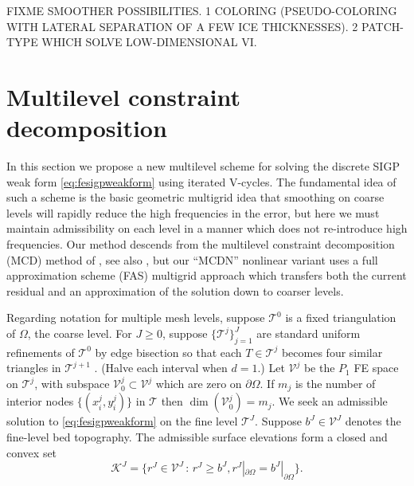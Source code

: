 \documentclass[letterpaper,final,12pt,reqno]{amsart}
\theoremstyle{claim}
\numberwithin{equation}{section}
\numberwithin{figure}{section}
\numberwithin{table}{section}
\numberwithin{theorem}{section}
\begin{document}
FIXME SMOOTHER POSSIBILITIES.  1 COLORING (PSEUDO-COLORING WITH LATERAL SEPARATION OF A FEW ICE THICKNESSES).  2 PATCH-TYPE WHICH SOLVE LOW-DIMENSIONAL VI.


\section{Multilevel constraint decomposition} \label{sec:mcdstokes}

In this section we propose a new multilevel scheme for solving the discrete SIGP weak form \eqref{eq:fesigpweakform} using iterated V-cycles.  The fundamental idea of such a scheme is the basic geometric multigrid idea that smoothing on coarse levels will rapidly reduce the high frequencies in the error, but here we must maintain admissibility on each level in a manner which does not re-introduce high frequencies.  Our method descends from the multilevel constraint decomposition (MCD) method of \cite{Tai2003}, see also \cite{GraeserKornhuber2009}, but our ``MCDN'' nonlinear variant uses a full approximation scheme (FAS) multigrid \cite{Trottenbergetal2001} approach which transfers both the current residual and an approximation of the solution down to coarser levels.

Regarding notation for multiple mesh levels, suppose $\mathcal{T}^0$ is a fixed triangulation of $\Omega$, the coarse level.  For $J\ge 0$, suppose $\{\mathcal{T}^j\}_{j=1}^J$ are standard uniform refinements of $\mathcal{T}^0$ by edge bisection so that each $T \in \mathcal{T}^j$ becomes four similar triangles in $\mathcal{T}^{j+1}$ \cite{Braess2007}.  (Halve each interval when $d=1$.)  Let $\mathcal{V}^j$ be the $P_1$ FE space on $\mathcal{T}^j$, with subspace $\mathcal{V}_0^j \subset \mathcal{V}^j$ which are zero on $\partial\Omega$.  If $m_j$ is the number of interior nodes $\{(x_i^j,y_i^j)\}$ in $\mathcal{T}$ then $\dim(\mathcal{V}_0^j)=m_j$.  We seek an admissible solution to \eqref{eq:fesigpweakform} on the fine level $\mathcal{T}^J$.  Suppose $b^J \in \mathcal{V}^J$ denotes the fine-level bed topography.  The admissible surface elevations form a closed and convex set
\begin{equation}
\mathcal{K}^J = \{r^J \in \mathcal{V}^J \,:\, r^J \ge b^J, r^J|_{\partial\Omega} = b^J|_{\partial\Omega}\}.  \label{eq:singleadmissible}
\end{equation}
\end{document}
